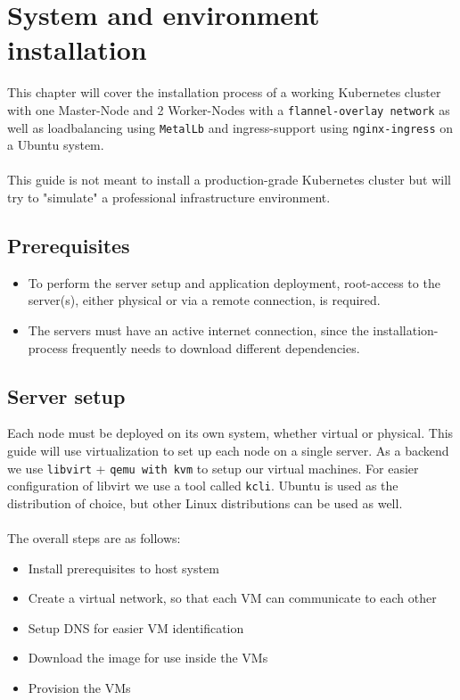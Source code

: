 \chapter{System and environment installation}

This chapter will cover the installation process of a working Kubernetes cluster with one Master-Node and 2 Worker-Nodes with a \texttt{flannel-overlay network} as well as loadbalancing using \texttt{MetalLb} and ingress-support using \texttt{nginx-ingress} on a Ubuntu system.\\\\
This guide is not meant to install a production-grade Kubernetes cluster but will try to "simulate" a professional infrastructure environment.

\section{Prerequisites}
 \begin{itemize}
     \item To perform the server setup and application deployment, root-access to the server(s), either physical or via a remote connection, is required.
     \item The servers must have an active internet connection, since the installation-process frequently needs to download different dependencies.
 \end{itemize}
\section{Server setup}
Each node must be deployed on its own system, whether virtual or physical. This guide will use virtualization to set up each node on a single server. As a backend we use \texttt{libvirt} + \texttt{qemu with kvm} to setup our virtual machines. For easier configuration of libvirt we use a tool called \texttt{kcli}. Ubuntu is used as the distribution of choice, but other Linux distributions can be used as well.\\\\
The overall steps are as follows:
\begin{itemize}
	\item Install prerequisites to host system
	\item Create a virtual network, so that each VM can communicate to each other
	\item Setup DNS for easier VM identification
	\item Download the image for use inside the VMs
	\item Provision the VMs
\end{itemize}

